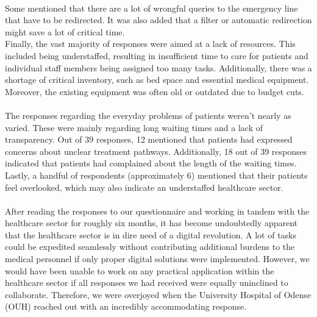 \\
Some mentioned that there are a lot of wrongful queries to the emergency line that have to be redirected. It was also added that a filter or automatic redirection might save a lot of critical time.
\\
Finally, the vast majority of responses were aimed at a lack of resources. This included being understaffed, resulting in insufficient time to care for patients and individual staff members being assigned too many tasks. Additionally, there was a shortage of critical inventory, such as bed space and essential medical equipment. Moreover, the existing equipment was often old or outdated due to budget cuts.
\\
\\
The responses regarding the everyday problems of patients weren't nearly as varied. These were mainly regarding long waiting times and a lack of transparency. Out of 39 responses, 12 mentioned that patients had expressed concerns about unclear treatment pathways. Additionally, 18 out of 39 responses indicated that patients had complained about the length of the waiting times. Lastly, a handful of respondents (approximately 6) mentioned that their patients feel overlooked, which may also indicate an understaffed healthcare sector.
\\
\\
After reading the responses to our questionnaire and working in tandem with the healthcare sector for roughly six months, it has become undoubtedly apparent that the healthcare sector is in dire need of a digital revolution. A lot of tasks could be expedited seamlessly without contributing additional burdens to the medical personnel if only proper digital solutions were implemented. However, we would have been unable to work on any practical application within the healthcare sector if all responses we had received were equally uninclined to collaborate. Therefore, we were overjoyed when the University Hospital of Odense (OUH) reached out with an incredibly accommodating response.

